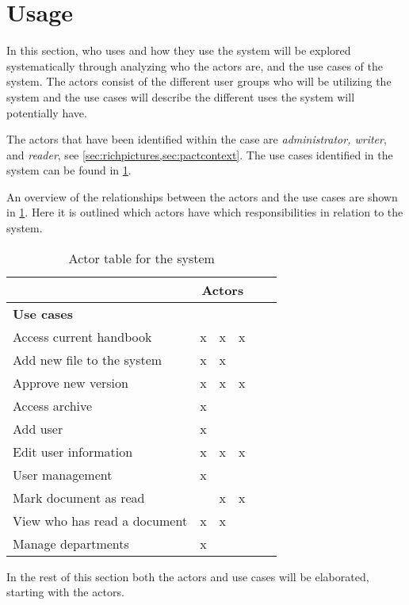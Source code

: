 \section{Usage}\label{sec:Usage}
In this section, who uses and how they use the system will be explored systematically through analyzing who the actors are, and the use cases of the system.
The actors consist of the different user groups who will be utilizing the system and the use cases will describe the different uses the system will potentially have.

The actors that have been identified within the case are \textit{administrator, writer}, and \textit{reader}, see \cref{sec:richpictures,sec:pactcontext}.
The use cases identified in the system can be found in \cref{tab:ActorTable}.

An overview of the relationships between the actors and the use cases are shown in \cref{tab:ActorTable}.
Here it is outlined which actors have which responsibilities in relation to the system.

\begin{table}[H]
	\begin{center}
	\begin{tabular}{| l | c | c | c | c | c |}
		\hline
		& \multicolumn{3}{c|}{\textbf{Actors}} \\
		\hline
		\textbf{Use cases} & \rotatebox{90}{Administrator }  & \rotatebox{90}{Writer} & \rotatebox{90}{Reader} \\
		\hline
		Access current handbook & x & x & x \\
		\hline
		Add new file to the system & x & x & \\
		\hline
		Approve new version & x & x & x \\
		\hline
		Access archive & x & & \\
		\hline
		Add user & x & & \\
		\hline
		Edit user information & x & x & x\\
		\hline
		User management & x & & \\
		\hline
		Mark document as read & & x & x \\
		\hline
		View who has read a document & x & x & \\
		\hline
		Manage departments & x & & \\
		\hline
	\end{tabular}
	\end{center}
	\caption{Actor table for the system}\label{tab:ActorTable}
\end{table}

In the rest of this section both the actors and use cases will be elaborated, starting with the actors.
